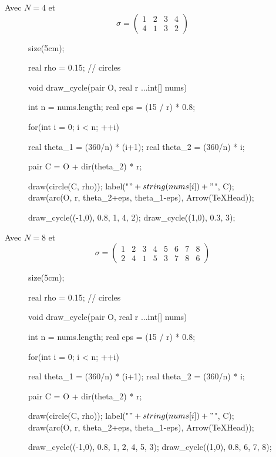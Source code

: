 \begin{rmk}
	Avec $N=4$ et \[
		\sigma = \begin{pmatrix}
			1&2&3&4\\
			4&1&3&2
		\end{pmatrix}
	\]

	\begin{figure}[H]
		\centering

		\begin{asy}
			size(5cm);

			real rho = 0.15; // circles

			void draw_cycle(pair O, real r ...int[] nums) {
				int n = nums.length;
				real eps = (15 / r) * 0.8;

				for(int i = 0; i < n; ++i) {
					real theta_1 = (360/n) * (i+1);
					real theta_2 = (360/n) * i;

					pair C = O + dir(theta_2) * r;

					draw(circle(C, rho));
					label("$" + string(nums[i]) + "$", C);
					draw(arc(O, r, theta_2+eps, theta_1-eps), Arrow(TeXHead));
				}
			}

			draw_cycle((-1,0), 0.8, 1, 4, 2);
			draw_cycle((1,0), 0.3, 3);
		\end{asy}
	\end{figure}

	Avec $N = 8$ et \[
		\sigma = \begin{pmatrix}
			1&2&3&4&5&6&7&8\\
			2&4&1&5&3&7&8&6
		\end{pmatrix} 
	\]

	\begin{figure}[H]
		\centering

		\begin{asy}
			size(5cm);

			real rho = 0.15; // circles

			void draw_cycle(pair O, real r ...int[] nums) {
				int n = nums.length;
				real eps = (15 / r) * 0.8;

				for(int i = 0; i < n; ++i) {
					real theta_1 = (360/n) * (i+1);
					real theta_2 = (360/n) * i;

					pair C = O + dir(theta_2) * r;

					draw(circle(C, rho));
					label("$" + string(nums[i]) + "$", C);
					draw(arc(O, r, theta_2+eps, theta_1-eps), Arrow(TeXHead));
				}
			}

			draw_cycle((-1,0), 0.8, 1, 2, 4, 5, 3);
			draw_cycle((1,0), 0.8, 6, 7, 8);
		\end{asy}
	\end{figure}
\end{rmk}

